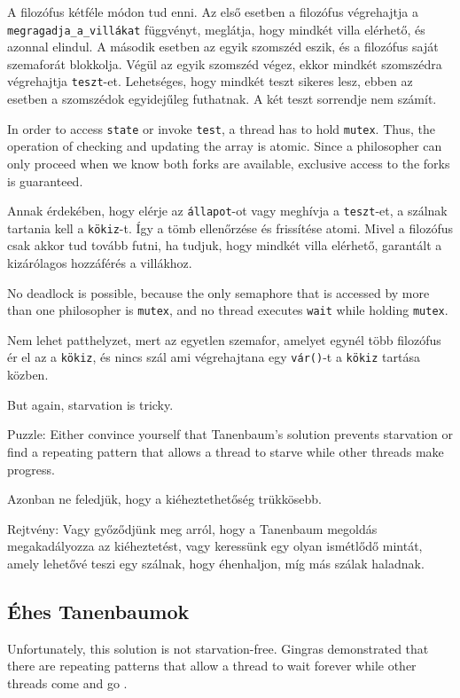 \documentclass{book}
\newcommand{\clearemptydoublepage}{\newpage\cleardoublepage}
\begin{document}
A filozófus kétféle módon tud enni. Az első esetben a filozófus
végrehajtja a {\tt megragadja\_a\_villákat} függvényt, meglátja, hogy mindkét villa elérhető,
és azonnal elindul. A második esetben az egyik szomszéd eszik, és a filozófus
saját szemaforát blokkolja. Végül az egyik szomszéd végez, ekkor mindkét
szomszédra végrehajtja {\tt teszt}-et. Lehetséges, hogy mindkét teszt sikeres lesz, ebben
az esetben a szomszédok egyidejűleg futhatnak. A két teszt sorrendje nem számít.

In order to access {\tt state} or invoke {\tt test}, a thread
has to hold {\tt mutex}.  Thus, the operation of checking and
updating the array is atomic.  Since a philosopher can only proceed
when we know both forks are available, exclusive access to the forks
is guaranteed.

Annak érdekében, hogy elérje az {\tt állapot}-ot vagy meghívja a {\tt teszt}-et,
a szálnak tartania kell a {\tt kökiz}-t. Így a tömb ellenőrzése és frissítése atomi.
Mivel a filozófus csak akkor tud tovább futni, ha tudjuk, hogy mindkét villa elérhető,
garantált a kizárólagos hozzáférés a villákhoz.

No deadlock is possible, because the only semaphore that is accessed
by more than one philosopher is {\tt mutex}, and no thread executes
{\tt wait} while holding {\tt mutex}.

Nem lehet patthelyzet, mert az egyetlen szemafor, amelyet egynél több filozófus
ér el az a {\tt kökiz}, és nincs szál ami végrehajtana egy {\tt vár()}-t a {\tt kökiz}
tartása közben.

But again, starvation is tricky.

Puzzle: Either convince yourself that Tanenbaum's solution prevents
starvation or find a repeating pattern that allows a thread to starve
while other threads make progress.

Azonban ne feledjük, hogy a kiéheztethetőség trükkösebb.

Rejtvény: Vagy győződjünk meg arról, hogy a Tanenbaum megoldás megakadályozza
az kiéheztetést, vagy keressünk egy olyan ismétlődő mintát, amely lehetővé teszi
egy szálnak, hogy éhenhaljon, míg más szálak haladnak.

\clearemptydoublepage
\subsection{Éhes Tanenbaumok}

Unfortunately, this solution is not starvation-free.  Gingras
demonstrated that there are repeating patterns that allow a
thread to wait forever while other threads come and go
\cite{gingras90dining}.
\end{document}
